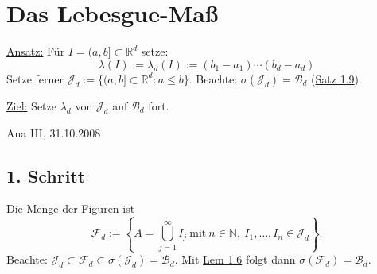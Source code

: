 \documentclass[a4paper]{scrreprt}
\newcommand{\R}{\mathbb{R}}
\newcommand{\N}{\mathbb{N}}
\newcommand{\Borel}{\mathcal{B}}
\newcommand{\Bd}{\Borel_d}
\newcommand{\Fd}{\mathcal{F}_d}
\newcommand{\Jd}{\mathcal{J}_d}
\newcommand{\jlabel}[1]{\label{j_#1}}
\newcommand{\jhyperref}[2]{\hyperref[j_#1]{#2}}
\newcommand{\jlink}[1]{\jhyperref{#1}{#1}}
\newcommand{\jspacesmall}{\vspace{4pt}}
\newcommand{\jdate}[1]{\jspacesmall\begin{center}\jlabel{#1}\tiny{Ana III, #1}\end{center}}
\theoremstyle{plain}
\theoremstyle{definition}
\begin{document}
{{\section{Das Lebesgue-Maß}

\uline{Ansatz:} Für $I=(a,b] \subset \R^d$ setze:
\jlabel{(1.2)}
\begin{equation}
    \lambda(I) := \lambda_d(I) := (b_1-a_1) \cdots (b_d-a_d)
\end{equation}
Setze ferner $\Jd := \{(a,b] \subset \R^d: a \le b\}$. Beachte: $\sigma(\Jd) = \Bd$ (\jlink{Satz 1.9}).

\jspacesmall

\uline{Ziel:} Setze $\lambda_d$ von $\Jd$ auf $\Bd$ fort.

\jdate{31.10.2008}

\subsection*{1. Schritt}

Die Menge der Figuren ist
\begin{displaymath}
    \Fd := \left \{A = \bigcup_{j=1}^\infty I_j \ \text{mit} \ n\in\N, \ I_1, \dots, I_n \in  \Jd \right \}.
\end{displaymath}
Beachte: $\Jd \subset \Fd \subset \sigma(\Jd) = \Bd$. Mit \jlink{Lem 1.6} folgt dann $\sigma(\Fd) = \Bd$.

}}
\end{document}
